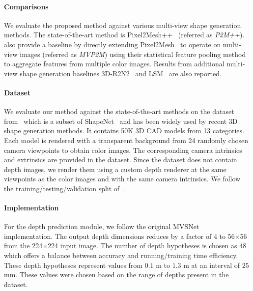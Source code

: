 \paragraph{Comparisons}
We evaluate the proposed method against various multi-view shape generation methods.
The state-of-the-art method is Pixel2Mesh++~\cite{wen2019pixel2mesh++} (referred as \emph{P2M++}). \cite{wen2019pixel2mesh++} also provide a baseline by directly extending Pixel2Mesh~\cite{wang2018pixel2mesh} to operate on multi-view images (referred as \emph{MVP2M}) using their statistical feature pooling method to aggregate features from multiple color images.
Results from additional multi-view shape generation baselines 3D-R2N2~\cite{3dr2n2} and LSM~\cite{kar2017lsm} are also reported.
\vspace{-4mm}
\paragraph{Dataset}
We evaluate our method against the state-of-the-art methods on the dataset from~\cite{3dr2n2}
which is a subset of ShapeNet~\cite{chang2015shapenet} and has been widely used by recent 3D shape generation methods.
It contains 50K 3D CAD models from 13 categories.
Each model is rendered with a transparent background from 24 randomly chosen camera viewpoints to obtain color images.
The corresponding camera intrinsics and extrinsics are provided in the dataset.
Since the dataset does not contain depth images, we render them using a custom depth renderer at the same viewpoints as the color images and with the same camera intrinsics.
We follow the training/testing/validation split of~\cite{gkioxari2019meshrcnn}.
\vspace{-4mm}
\paragraph{Implementation}
For the depth prediction module, we follow the original MVSNet~\cite{yao2018mvsnet} implementation.
The output depth dimensions reduces by a factor of 4 to 56$\times$56 from the 224$\times$224 input image.
The number of depth hypotheses is chosen as 48 which offers a balance between accuracy and running/training time efficiency.
These depth hypotheses represent values from $0.1$ m to $1.3$ m at an interval of $25$ mm.
These values were chosen based on the range of depths present in the dataset.


